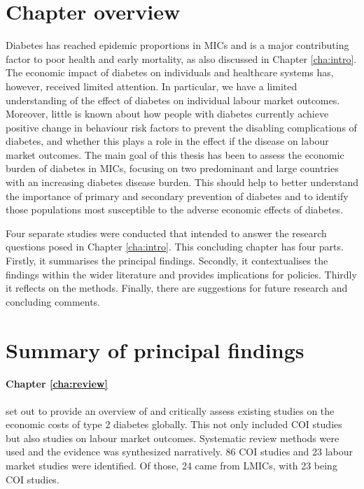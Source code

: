 \section{Chapter overview}
Diabetes has reached epidemic proportions in \acp{MIC} and is a major contributing factor to poor health and early mortality, as also discussed in Chapter \ref{cha:intro}. The economic impact of diabetes on individuals and healthcare systems has, however, received limited attention. In particular, we have a limited understanding of the effect of diabetes on individual labour market outcomes. Moreover, little is known about how people with diabetes currently achieve positive change in behaviour risk factors to prevent the disabling complications of diabetes, and whether this plays a role in the effect if the disease on labour market outcomes. The main goal of this thesis has been to assess the economic burden of diabetes in \acp{MIC}, focusing on two predominant and large countries with an increasing diabetes disease burden. This should help to better understand the importance of primary and secondary prevention of diabetes and to identify those populations most susceptible to the adverse economic effects of diabetes.

Four separate studies were conducted that intended to answer the research questions posed in Chapter \ref{cha:intro}. This concluding chapter has four parts. Firstly, it summarises the principal findings. Secondly, it contextualises the findings within the wider literature and provides implications for policies. Thirdly it reflects on the methods. Finally, there are suggestions for future research and concluding comments.

\section{Summary of principal findings}



\paragraph{Chapter \ref{cha:review}} set out to provide an overview of and critically assess existing studies on the economic costs of type 2 diabetes globally. This not only included \ac{COI} studies but also studies on labour market outcomes. Systematic review methods were used and the evidence was synthesized narratively. 86 \ac{COI} studies and 23 labour market studies were identified. Of those, 24 came from \acp{LMIC}, with 23 being \ac{COI} studies.

